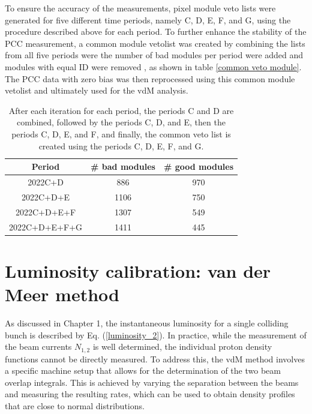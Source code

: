 To ensure the accuracy of the measurements, pixel module veto lists were generated for five different time periods, namely C, D, E, F, and G, using the procedure described above for each period. To further enhance the stability of the PCC measurement, a common module vetolist was created by combining the lists from all five periods were the number of bad modules per period were added and modules with equal ID were removed , as shown in table \ref{common veto module}. The PCC data with zero bias was then reprocessed using this common module vetolist and ultimately used for the vdM analysis.

\begin{table}[ht]
\centering
\caption[Number of good and bad modules for the combined periods]{After each iteration for each period, the periods C and D are combined, followed by the periods C, D, and E, then the periods C, D, E, and F, and finally, the common veto list is created using the periods C, D, E, F, and G.}
\begin{tabular}{ccc}
\textbf{Period} & \textbf{\# bad modules} & \textbf{\# good modules}  \\ 
\toprule
2022C+D         & 886                     & 970                       \\
2022C+D+E       & 1106                    & 750                       \\
2022C+D+E+F     & 1307                    & 549                       \\
2022C+D+E+F+G   & 1411                    & 445                   
\label{common  veto module}   
\end{tabular}
\end{table}


\section{Luminosity calibration: van der Meer method}

As discussed in Chapter 1, the instantaneous luminosity for a single colliding bunch is described by Eq. (\ref{luminosity_2}). In practice, while the measurement of the beam currents $N_{1,2}$ is well determined, the individual proton density functions cannot be directly measured. To address this, the vdM method involves a specific machine setup that allows for the determination of the two beam overlap integrals. This is achieved by varying the separation between the beams and measuring the resulting rates, which can be used to obtain density profiles that are close to normal distributions.

